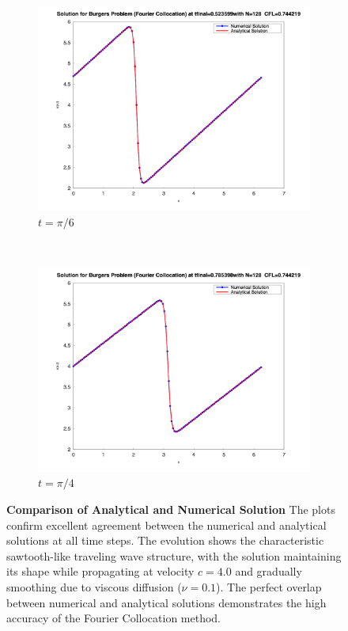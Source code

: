 \begin{figure}[H]
	\begin{subfigure}{0.5\textwidth}
		\includegraphics[width=\textwidth]{media/burger_tfinal_fc_128_0.523599.png}
		\caption{$t = \pi / 6$}
		\label{sfig:sublabel3}
	\end{subfigure}%
	~
	\begin{subfigure}{0.5\textwidth}
		\includegraphics[width=\textwidth]{media/burger_tfinal_fc_128_0.785398.png}
		\caption{$t = \pi / 4$}
		\label{sfig:sublabel4}
	\end{subfigure}
	\caption{\textbf{Comparison of Analytical and Numerical Solution}
		The plots confirm excellent agreement between the numerical and analytical solutions at all time steps. The evolution shows the characteristic sawtooth-like traveling wave structure, with the solution maintaining its shape while propagating at velocity $c = 4.0$ and gradually smoothing due to viscous diffusion ($\nu = 0.1$). The perfect overlap between numerical and analytical solutions demonstrates the high accuracy of the Fourier Collocation method.
	}
	\label{fig:figureLabel}
\end{figure}

